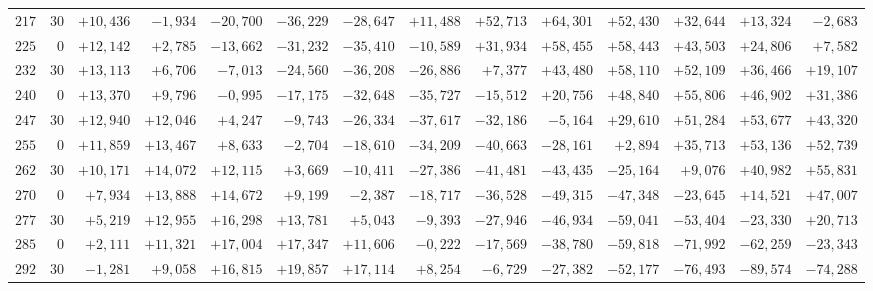 \begin{landscape}
\begin{longtable}{@{}rr|r|r|r|r|r|r|r|r|r|r|r|r@{}}
\(217\) & \(30\) & \(+10{,}436\) & \(-1{,}934\) & \(-20{,}700\) & \(-36{,}229\) & \(-28{,}647\) & \(+11{,}488\) & \(+52{,}713\) & \(+64{,}301\) & \(+52{,}430\) & \(+32{,}644\) & \(+13{,}324\) & \(-2{,}683\)\\
\(225\) & \(0\) & \(+12{,}142\) & \(+2{,}785\) & \(-13{,}662\) & \(-31{,}232\) & \(-35{,}410\) & \(-10{,}589\) & \(+31{,}934\) & \(+58{,}455\) & \(+58{,}443\) & \(+43{,}503\) & \(+24{,}806\) & \(+7{,}582\)\\
\(232\) & \(30\) & \(+13{,}113\) & \(+6{,}706\) & \(-7{,}013\) & \(-24{,}560\) & \(-36{,}208\) & \(-26{,}886\) & \(+7{,}377\) & \(+43{,}480\) & \(+58{,}110\) & \(+52{,}109\) & \(+36{,}466\) & \(+19{,}107\)\\[2pt]
\(240\) & \(0\) & \(+13{,}370\) & \(+9{,}796\) & \(-0{,}995\) & \(-17{,}175\) & \(-32{,}648\) & \(-35{,}727\) & \(-15{,}512\) & \(+20{,}756\) & \(+48{,}840\) & \(+55{,}806\) & \(+46{,}902\) & \(+31{,}386\)\\
\(247\) & \(30\) & \(+12{,}940\) & \(+12{,}046\) & \(+4{,}247\) & \(-9{,}743\) & \(-26{,}334\) & \(-37{,}617\) & \(-32{,}186\) & \(-5{,}164\) & \(+29{,}610\) & \(+51{,}284\) & \(+53{,}677\) & \(+43{,}320\)\\
\(255\) & \(0\) & \(+11{,}859\) & \(+13{,}467\) & \(+8{,}633\) & \(-2{,}704\) & \(-18{,}610\) & \(-34{,}209\) & \(-40{,}663\) & \(-28{,}161\) & \(+2{,}894\) & \(+35{,}713\) & \(+53{,}136\) & \(+52{,}739\)\\
\(262\) & \(30\) & \(+10{,}171\) & \(+14{,}072\) & \(+12{,}115\) & \(+3{,}669\) & \(-10{,}411\) & \(-27{,}386\) & \(-41{,}481\) & \(-43{,}435\) & \(-25{,}164\) & \(+9{,}076\) & \(+40{,}982\) & \(+55{,}831\)\\[2pt]
\(270\) & \(0\) & \(+7{,}934\) & \(+13{,}888\) & \(+14{,}672\) & \(+9{,}199\) & \(-2{,}387\) & \(-18{,}717\) & \(-36{,}528\) & \(-49{,}315\) & \(-47{,}348\) & \(-23{,}645\) & \(+14{,}521\) & \(+47{,}007\)\\
\(277\) & \(30\) & \(+5{,}219\) & \(+12{,}955\) & \(+16{,}298\) & \(+13{,}781\) & \(+5{,}043\) & \(-9{,}393\) & \(-27{,}946\) & \(-46{,}934\) & \(-59{,}041\) & \(-53{,}404\) & \(-23{,}330\) & \(+20{,}713\)\\
\(285\) & \(0\) & \(+2{,}111\) & \(+11{,}321\) & \(+17{,}004\) & \(+17{,}347\) & \(+11{,}606\) & \(-0{,}222\) & \(-17{,}569\) & \(-38{,}780\) & \(-59{,}818\) & \(-71{,}992\) & \(-62{,}259\) & \(-23{,}343\)\\
\(292\) & \(30\) & \(-1{,}281\) & \(+9{,}058\) & \(+16{,}815\) & \(+19{,}857\) & \(+17{,}114\) & \(+8{,}254\) & \(-6{,}729\) & \(-27{,}382\) & \(-52{,}177\) & \(-76{,}493\) & \(-89{,}574\) & \(-74{,}288\)\\[2pt]

\end{longtable}
\end{landscape}
